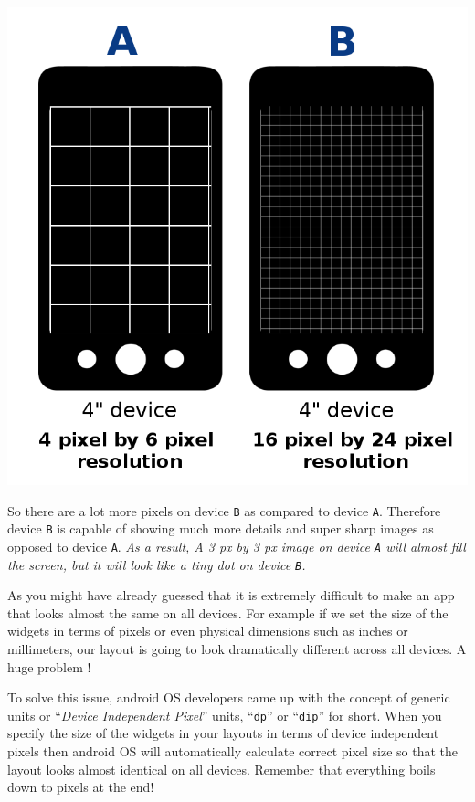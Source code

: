 \begin{center}
	\includegraphics[scale=1]{chapters/ch06/images/2}
\end{center} 

So there are a lot more pixels on device \texttt{B} as compared to device \texttt{A}. Therefore device \texttt{B} is capable of showing much more details and super sharp images as opposed to device \texttt{A}. \textit{As a result, A 3 px by 3 px image on device \texttt{A} will almost fill the screen, but it will look like a tiny dot on device \texttt{B}.} 

As you might have already guessed that it is extremely difficult to make an app that looks almost the same on all devices. For example if we set the size of the widgets in terms of pixels or even physical dimensions such as inches or millimeters, our layout is going to look dramatically different across all devices. A huge problem !

To solve this issue, android OS developers came up with the concept of generic units or ``\textit{Device Independent Pixel}'' units, ``\texttt{dp}'' or ``\texttt{dip}'' for short. When you specify the size of the widgets in your layouts in terms of device independent pixels then android OS will automatically calculate correct pixel size so that the layout looks almost identical on all devices. Remember that everything boils down to pixels at the end!

